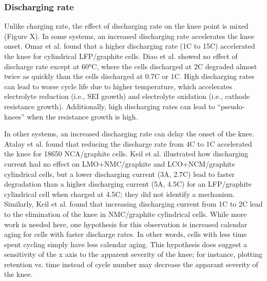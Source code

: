 \documentclass{article}
\begin{document}
\subsubsection{Discharging rate}

Unlike charging rate, the effect of discharging rate on the knee point is mixed (Figure X).
In some systems, an increased discharging rate
accelerates the knee onset.
Omar et al. \cite{omar_lithium_2014} found that a higher discharging rate (1C to 15C) accelerated the knee for cylindrical LFP/graphite cells.
Diao et al.\cite{diao_accelerated_2019} showed no effect of discharge rate except at 60°C, where the cells discharged at 2C degraded almost twice as quickly than the cells discharged at 0.7C or 1C.
High discharging rates can lead to worse cycle life due to higher temperature, which accelerates electrolyte reduction (i.e., SEI growth) and electrolyte oxidation (i.e., cathode resistance growth). Additionally, high discharging rates can lead to ``pseudo-knees'' when the resistance growth is high.

In other systems, an increased discharging rate can delay the onset of the knee.
Atalay et al.\cite{atalay_theory_2020} found that reducing the discharge rate from 4C to 1C accelerated the knee for 18650 NCA/graphite cells.
Keil et al.\cite{keil_charging_2016} illustrated how discharging current had no effect on LMO+NMC/graphite and LCO+NCM/graphite cylindrical cells, but a lower discharging current (3A, 2.7C) lead to faster degradation than a higher discharging current (5A, 4.5C) for an LFP/graphite cylindrical cell when charged at 4.5C; they did not identify a mechanism. 
Similarly, Keil et al.\cite{keil_linear_2019} found that increasing discharging current from 1C to 2C lead to the elimination of the knee in NMC/graphite cylindrical cells.
While more work is needed here, one hypothesis for this observation is increased calendar aging for cells with faster discharge rates.
In other words, cells with less time spent cycling simply have less calendar aging. This hypothesis does suggest a sensitivity of the x axis to the apparent severity of the knee; for instance, plotting retention vs. time instead of cycle number may decrease the apparant severity of the knee.
\end{document}
